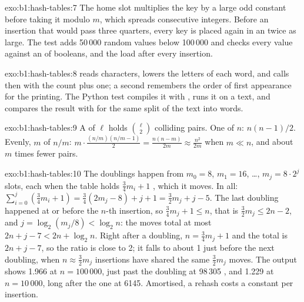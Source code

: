 \begin{solution}{exo:b1:hash-tables:7}
The home slot multiplies the key by a large odd constant before taking it modulo $m$, which spreads consecutive
integers. Before an insertion that would pass three quarters, every key is placed again in an  twice as large.
The test adds 50\,000 random values below 100\,000 and checks every value against an  of booleans, and the load
after every insertion.
\end{solution}

\begin{solution}{exo:b1:hash-tables:8}
 reads characters, lowers the letters of each word, and calls  then
 with the count plus one; a second  remembers the order of first appearance for the printing. The
Python test compiles it with , runs it on a text, and compares the result with
 for the same split of the text into words.
\end{solution}

\begin{solution}{exo:b1:hash-tables:9}
A  of $\ell$  holds $\binom{\ell}{2}$ colliding pairs. One  of $n$: $n(n - 1)/2$. Evenly, $m$  of
$n/m$: $m \cdot \frac{(n/m)(n/m - 1)}{2} = \frac{n(n - m)}{2m} \approx \frac{n^2}{2m}$ when $m \ll n$, and about $m$ times
fewer pairs.
\end{solution}

\begin{solution}{exo:b1:hash-tables:10}
The doublings happen from $m_0 = 8$, $m_1 = 16$, \dots, $m_j = 8 \cdot 2^j$ slots, each when the table holds $\frac34 m_i +
1$ , which it moves. In all: $\sum_{i=0}^{j} (\frac34 m_i + 1) = \frac34 (2m_j - 8) + j + 1 = \frac32 m_j + j - 5$.
The last doubling happened at or before the $n$-th insertion, so $\frac34 m_j + 1 \leq n$, that is $\frac32 m_j \leq 2n -
2$, and $j = \log_2 (m_j/8) < \log_2 n$: the moves total at most $2n + j - 7 < 2n + \log_2 n$. Right after a doubling,
$n = \frac34 m_j + 1$ and the total is $2n + j - 7$, so the ratio is close to 2; it falls to about 1 just before the next
doubling, when $n \approx \frac32 m_j$ insertions have shared the same $\frac32 m_j$ moves.
The output shows 1.966 at $n = 100\,000$, just past the doubling at 98\,305 , and 1.229 at $n = 10\,000$, long after
the one at 6145. Amortised, a rehash costs a constant per insertion.
\end{solution}

